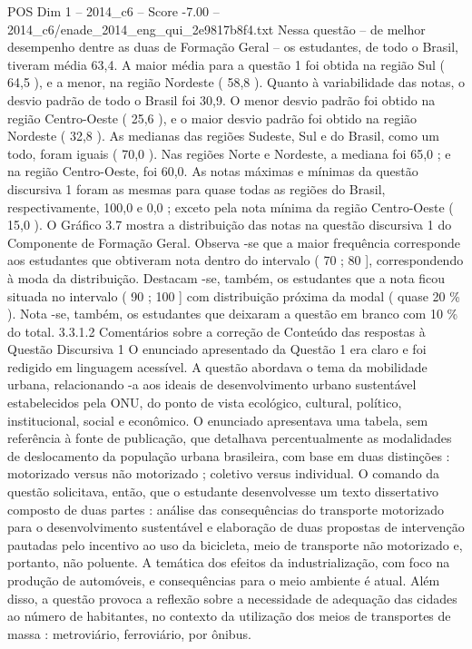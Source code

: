 \begin{textsample}{POS Dim 1 – 2014\_c6 – Score -7.00 – 2014\_c6/enade\_2014\_eng\_qui\_2e9817b8f4.txt}
Nessa questão – de melhor desempenho dentre as duas de Formação Geral – os estudantes, de todo o Brasil, tiveram média 63,4.
A maior média para a questão 1 foi obtida na região Sul ( 64,5 ), e a menor, na região Nordeste ( 58,8 ).
Quanto à variabilidade das notas, o desvio padrão de todo o Brasil foi 30,9.
O menor desvio padrão foi obtido na região Centro-Oeste ( 25,6 ), e o maior desvio padrão foi obtido na região Nordeste ( 32,8 ).
As medianas das regiões Sudeste, Sul e do Brasil, como um todo, foram iguais ( 70,0 ).
Nas regiões Norte e Nordeste, a mediana foi 65,0 ; e na região Centro-Oeste, foi 60,0.
As notas máximas e mínimas da questão discursiva 1 foram as mesmas para quase todas as regiões do Brasil, respectivamente, 100,0 e 0,0 ; exceto pela nota mínima da região Centro-Oeste ( 15,0 ).
O Gráfico 3.7 mostra a distribuição das notas na questão discursiva 1 do Componente de Formação Geral.
Observa -se que a maior frequência corresponde aos estudantes que obtiveram nota dentro do intervalo ( 70 ; 80 ], correspondendo à moda da distribuição.
Destacam -se, também, os estudantes que a nota ficou situada no intervalo ( 90 ; 100 ] com distribuição próxima da modal ( quase 20 \% ).
Nota -se, também, os estudantes que deixaram a questão em branco com 10 \% do total. 3.3.1.2 Comentários sobre a correção de Conteúdo das respostas à Questão Discursiva 1 O enunciado apresentado da Questão 1 era claro e foi redigido em linguagem acessível.
A questão abordava o tema da mobilidade urbana, relacionando -a aos ideais de desenvolvimento urbano sustentável estabelecidos pela ONU, do ponto de vista ecológico, cultural, político, institucional, social e econômico.
O enunciado apresentava uma tabela, sem referência à fonte de publicação, que detalhava percentualmente as modalidades de deslocamento da população urbana brasileira, com base em duas distinções : motorizado versus não motorizado ; coletivo versus individual.
O comando da questão solicitava, então, que o estudante desenvolvesse um texto dissertativo composto de duas partes : análise das consequências do transporte motorizado para o desenvolvimento sustentável e elaboração de duas propostas de intervenção pautadas pelo incentivo ao uso da bicicleta, meio de transporte não motorizado e, portanto, não poluente.
A temática dos efeitos da industrialização, com foco na produção de automóveis, e consequências para o meio ambiente é atual.
Além disso, a questão provoca a reflexão sobre a necessidade de adequação das cidades ao número de habitantes, no contexto da utilização dos meios de transportes de massa : metroviário, ferroviário, por ônibus.

\end{textsample}
